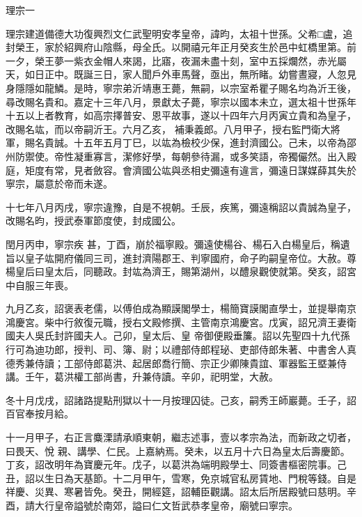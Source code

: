 
\begin{pinyinscope}

 理宗一



 理宗建道備德大功復興烈文仁武聖明安孝皇帝，諱昀，太祖十世孫。父希□盧，追封榮王，家於紹興府山陰縣，母全氏。以開禧元年正月癸亥生於邑中虹橋里第。前
 一夕，榮王夢一紫衣金帽人來謁，比寤，夜漏未盡十刻，室中五採爛然，赤光屬天，如日正中。既誕三日，家人聞戶外車馬聲，亟出，無所睹。幼嘗晝寢，人忽見身隱隱如龍鱗。是時，寧宗弟沂靖惠王薨，無嗣，以宗室希瞿子賜名均為沂王後，尋改賜名貴和。嘉定十三年八月，景獻太子薨，寧宗以國本未立，選太祖十世孫年十五以上者教育，如高宗擇普安、恩平故事，遂以十四年六月丙寅立貴和為皇子，改賜名竑，而以帝嗣沂王。六月乙亥，
 補秉義郎。八月甲子，授右監門衛大將軍，賜名貴誠。十五年五月丁巳，以竑為檢校少保，進封濟國公。己未，以帝為邵州防禦使。帝性凝重寡言，潔修好學，每朝參待漏，或多笑語，帝獨儼然。出入殿庭，矩度有常，見者斂容。會濟國公竑與丞相史彌遠有違言，彌遠日謀媒薛其失於寧宗，屬意於帝而未遂。



 十七年八月丙戌，寧宗違豫，自是不視朝。壬辰，疾篤，彌遠稱詔以貴誠為皇子，改賜名昀，授武泰軍節度使，封成國公。



 閏月丙申，寧宗疾
 甚，丁酉，崩於福寧殿。彌遠使楊谷、楊石入白楊皇后，稱遺旨以皇子竑開府儀同三司，進封濟陽郡王、判寧國府，命子昀嗣皇帝位。大赦。尊楊皇后曰皇太后，同聽政。封竑為濟王，賜第湖州，以醴泉觀使就第。癸亥，詔宮中自服三年喪。



 九月乙亥，詔褒表老儒，以傅伯成為顯謨閣學士，楊簡寶謨閣直學士，並提舉南京鴻慶宮。柴中行敘復元職，授右文殿修撰、主管南京鴻慶宮。戊寅，詔兄濟王妻衛國夫人吳氏封許國夫人。己卯，皇太后、皇
 帝御便殿垂簾。詔以先聖四十九代孫行可為迪功郎，授判、司、簿、尉；以禮部侍郎程珌、吏部侍郎朱著、中書舍人真德秀兼侍讀；工部侍郎葛洪、起居郎喬行簡、宗正少卿陳貴誼、軍器監王塈兼侍講。壬午，葛洪權工部尚書，升兼侍讀。辛卯，祀明堂，大赦。



 冬十月戊戌，詔諸路提點刑獄以十一月按理囚徒。己亥，嗣秀王師巖薨。壬子，詔百官奉按月給。



 十一月甲子，右正言麋溧請承順東朝，繼志述事，壹以孝宗為法，而新政之切者，曰畏天、悅
 親、講學、仁民。上嘉納焉。癸未，以五月十六日為皇太后壽慶節。丁亥，詔改明年為寶慶元年。戊子，以葛洪為端明殿學士、同簽書樞密院事。己丑，詔以生日為天基節。十二月甲午，雪寒，免京城官私房賃地、門稅等錢。自是祥慶、災異、寒暑皆免。癸丑，開經筵，詔輔臣觀講。詔太后所居殿號曰慈明。辛酉，請大行皇帝謚號於南郊，謚曰仁文哲武恭孝皇帝，廟號曰寧宗。




\end{pinyinscope}
